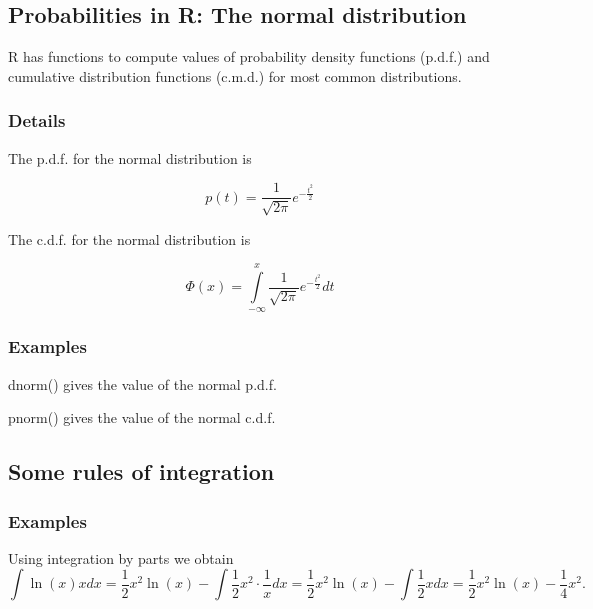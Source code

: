 \documentclass[12pt,a4paper]{article}
\theoremstyle{regla}
\theoremstyle{remark}
\theoremstyle{definition}
\theoremstyle{nonumberbreak}
\begin{document}
\subsection{Probabilities in R: The normal distribution}
\begin{fbox}
\begin{minipage}{0.97\textwidth}
R has functions to compute values of probability density functions (p.d.f.) and cumulative distribution functions (c.m.d.) for most common distributions.  
\end{minipage}
\end{fbox}
\subsubsection{Details}
The p.d.f. for the normal distribution is


$$p(t)=\frac{1}{\sqrt{2\pi}}e^{-\frac{t^2}{2}}$$

The c.d.f. for the normal distribution is


$$\Phi(x)=\int\limits_{-\infty}^x\frac{1}{\sqrt{2\pi}}e^{-\frac{t^2}{2}}dt$$



\subsubsection{Examples}
\begin{xmpl}
dnorm() gives the value of the normal p.d.f.
\end{xmpl}
\begin{xmpl}
pnorm() gives the value of the normal c.d.f.
\end{xmpl}

\subsection{Some rules of integration}
\subsubsection{Examples}
\begin{xmpl}

Using integration by parts we obtain 
$$\int \ln(x)x dx= \frac{1}{2}x^2\ln(x)-\int \frac{1}{2}x^2\cdot \frac{1}{x} dx = \frac{1}{2}x^2\ln(x)-\int \frac{1}{2}x dx=\frac{1}{2}x^2\ln(x)-\frac{1}{4}x^2.$$
\end{xmpl}
\end{document}
